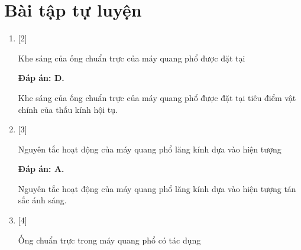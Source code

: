 \section{Bài tập tự luyện}
\begin{enumerate}[label=\bfseries Câu \arabic*:]
	
	\item {} [2]
	\cauhoi
	{Khe sáng của ống chuẩn trực của máy quang phổ được đặt tại
	}
	
	\loigiai
	{		\textbf{Đáp án: D.}
		
		Khe sáng của ống chuẩn trực của máy quang phổ được đặt tại tiêu điểm vật chính của thấu kính hội tụ.
	}
	
	\item {} [3]
	\cauhoi
	{Nguyên tắc hoạt động của máy quang phổ lăng kính dựa vào hiện tượng
	}
	
	\loigiai
	{		\textbf{Đáp án: A.}
		
		Nguyên tắc hoạt động của máy quang phổ lăng kính dựa vào hiện tượng tán sắc ánh sáng.
	}
	
	\item {} [4]
	\cauhoi
	{Ống chuẩn trực trong máy quang phổ có tác dụng 
	}
	

\end{enumerate}
